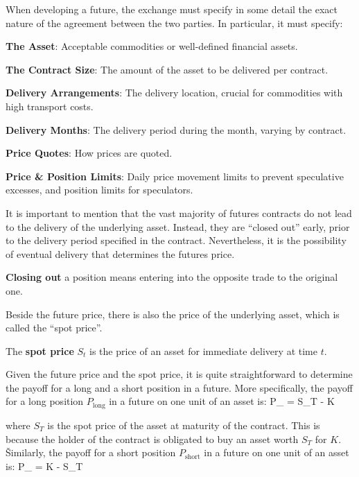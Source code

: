 When developing a future, the exchange must specify in some detail the exact nature of the agreement between the two
parties. In particular, it must specify:
\bit
\item \textbf{The Asset}: Acceptable commodities or well-defined financial assets.
\item \textbf{The Contract Size}: The amount of the asset to be delivered per contract.
\item \textbf{Delivery Arrangements}: The delivery location, crucial for commodities with high transport costs.
\item \textbf{Delivery Months}: The delivery period during the month, varying by contract.
\item \textbf{Price Quotes}: How prices are quoted.
\item \textbf{Price \& Position Limits}: Daily price movement limits to prevent speculative excesses, and position
limits for speculators.
\eit

It is important to mention that the vast majority of futures contracts do not lead to the delivery of the underlying
asset. Instead, they are ``closed out'' early, prior to the delivery period specified in the contract. Nevertheless,
it is the possibility of eventual delivery that determines the futures price.

\textbf{Closing out} a position means entering into the opposite trade to the original one.
\ed

Beside the future price, there is also the price of the underlying asset, which is called the ``spot price''.

The \textbf{spot price} $S_t$ is the price of an asset for immediate delivery at time $t$.
\ed

Given the future price and the spot price, it is quite straightforward to determine the payoff for a long and a short
position in a future. More specifically, the payoff for a long position $P_{\text{long}}$ in a future on one unit of an
asset is:
\bse
P_{} = S_T - K
\ese

where $S_T$ is the spot price of the asset at maturity of the contract. This is because the holder of the contract is
obligated to buy an asset worth $S_T$ for $K$. \v

Similarly, the payoff for a short position $P_{\text{short}}$ in a future on one unit of an asset is:
\bse
P_{} = K - S_T
\ese

\vspace{5pt}

